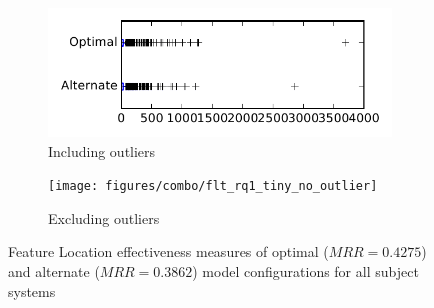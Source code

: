 
\begin{figure}
    \centering
    \begin{subfigure}{.4\textwidth}
        \centering
        \includegraphics[height=0.4\textheight]{figures/combo/flt_rq1_tiny}
        \caption{Including outliers}\label{fig:combo:flt:rq1:tiny_outlier}
    \end{subfigure}%
    \begin{subfigure}{.4\textwidth}
        \centering
        \texttt{[image: figures/combo/flt\_rq1\_tiny\_no\_outlier]}
        \caption{Excluding outliers}\label{fig:combo:flt:rq1:tiny_no_outlier}
    \end{subfigure}
\caption{Feature Location effectiveness measures of optimal ($MRR=0.4275$) and alternate ($MRR=0.3862$) model configurations for all subject systems}
\label{fig:combo:flt:rq1:tiny}
\end{figure}

